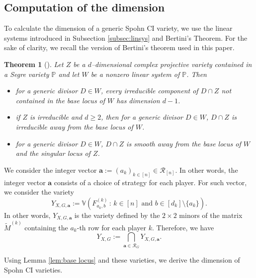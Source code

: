 \documentclass[11pt]{amsart}
\numberwithin{equation}{section}
\theoremstyle{plain}
\newtheorem{theorem}{Theorem}
\numberwithin{theorem}{section}
\theoremstyle{definition}
\newcommand{\PP}{{\mathbb P}}
\begin{document}
\subsection{Computation of the dimension}\label{subsec:dim}

To calculate the dimension of a generic Spohn CI variety, we use the linear systems introduced in 
Subsection \ref{subsec:linsys} and Bertini's Theorem. For the sake of clarity, we recall the version of Bertini's theorem used in this paper.

\begin{theorem}[{\cite[Theorem 8.18]{hartshorne2013algebraic}}]\label{theo:Bertini}
    Let $Z$ be a $d$--dimensional complex projective variety contained in a Segre variety $\PP$ and let $W$ be a nonzero linear system of $\PP$. Then
    \begin{itemize}
        \item for a generic divisor $D\in W$, every irreducible component of $D\cap Z$ not contained in the base locus of $W$  has dimension $d-1$.
        \item if $Z$ is irreducible and $d\geq 2$, then for a generic divisor $D\in W$, $D\cap Z$ is irreducible away from the base locus of $W$.
        \item for a generic divisor $D\in W$, $D\cap Z$ is smooth away from the base locus of $W$ and the singular locus of $Z$.
    \end{itemize}
\end{theorem}


We consider the integer vector $\mathbf{a}:=(a_k)_{k\in[n]}\in \mathcal{R}_{[n]}$. In other words, the integer vector $\mathbf{a}$ consists of a choice of strategy for each player. For such vector, we consider the variety
\[
    Y_{X,G,\mathbf{a}}:=\mathbb{V}(F_{a_k,b}^{(k)}\,:\,k\in[n]\text{ and } b\in[d_k]\setminus\{a_k\}).
    \]
    In other words, $Y_{X,G,\mathbf{a}}$ is the variety defined by the $2\times 2$ minors of the matrix $\widetilde{M}^{(k)}$ containing the $a_k$-th row for each player $k$. Therefore, we have 
    \begin{equation}\label{eq:intersection}
    Y_{X,G}:= \bigcap_{\mathbf{a}\in \mathcal{R}_G} Y_{X,G,\mathbf{a}}.
    \end{equation}


\noindent Using Lemma \ref{lem:base locus} and these varieties, we derive the dimension of Spohn CI varieties.
\end{document}
